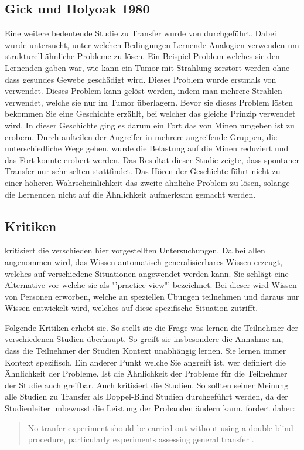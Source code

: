 \subsection{Gick und Holyoak 1980}

Eine weitere bedeutende Studie zu Transfer wurde von \citet{Gick1980} durchgeführt. Dabei wurde untersucht, unter welchen Bedingungen Lernende Analogien verwenden um strukturell ähnliche Probleme zu lösen. Ein Beispiel Problem welches sie den Lernenden gaben war, wie kann ein Tumor mit Strahlung zerstört werden ohne dass gesundes Gewebe geschädigt wird. Dieses Problem wurde erstmals von \citet{Duncker1945} verwendet. Dieses Problem kann gelöst werden, indem man mehrere Strahlen verwendet, welche sie nur im Tumor überlagern. Bevor sie dieses Problem lösten bekommen Sie eine Geschichte erzählt, bei welcher das gleiche Prinzip verwendet wird. In dieser Geschichte ging es darum ein Fort das von Minen umgeben ist zu erobern. Durch aufteilen der Angreifer in mehrere angreifende Gruppen, die unterschiedliche Wege gehen, wurde die Belastung auf die Minen reduziert und das Fort konnte erobert werden. Das Resultat dieser Studie zeigte, dass spontaner Transfer nur sehr selten stattfindet. Das Hören der Geschichte führt nicht zu einer höheren Wahrscheinlichkeit das zweite ähnliche Problem zu lösen, solange die Lernenden nicht auf die Ähnlichkeit aufmerksam gemacht werden.

\subsection{Kritiken}

\citet{Lave1988} kritisiert die verschieden hier vorgestellten Untersuchungen. Da bei allen angenommen wird, das  Wissen automatisch generalisierbares Wissen erzeugt, welches auf verschiedene Situationen angewendet werden kann. Sie schlägt eine Alternative vor welche sie als "'practice view"' bezeichnet. Bei dieser wird Wissen von Personen erworben, welche an speziellen Übungen teilnehmen und daraus nur Wissen entwickelt wird, welches auf diese spezifische Situation zutrifft.

Folgende Kritiken erhebt sie. So stellt sie die Frage was lernen die Teilnehmer der verschiedenen Studien überhaupt. So greift sie insbesondere die Annahme an, dass die Teilnehmer der Studien Kontext unabhängig lernen. Sie lernen immer Kontext spezifisch. Ein anderer Punkt welche Sie angreift ist, wer definiert die Ähnlichkeit der Probleme. Ist die Ähnlichkeit der Probleme für die Teilnehmer der Studie auch greifbar. Auch \citet{Detterman1993} kritisiert die Studien. So sollten seiner Meinung alle Studien zu Transfer als Doppel-Blind Studien durchgeführt werden, da der Studienleiter unbewusst die Leistung der Probanden ändern kann. \citet{Detterman1993} fordert daher:
\begin{quote}
No tranfer experiment should be carried out without using a double blind procedure, particularly experiments assessing general transfer \citet[S. 10]{Detterman1993}.
\end{quote}

